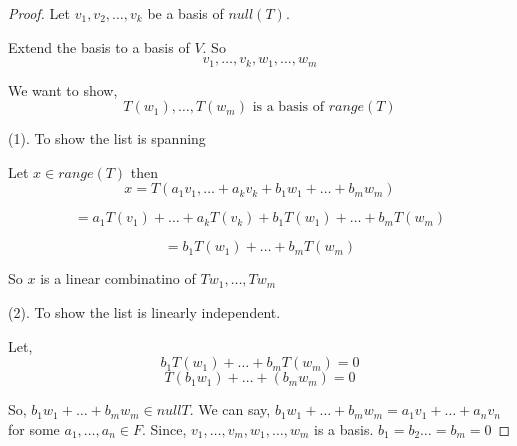 \begin{proof}
    Let $v_1,v_2,\dots,v_k$ be a basis of $null(T)$.

    Extend the basis to a basis of $V$. So 
    $$ v_1,\dots,v_k,w_1,\dots,w_m$$ 

    We want to show, 
    $$ T(w_1),\dots,T(w_m) \text{ is a basis of $range(T)$}$$

    (1). To show the list is spanning

    Let $x \in range(T)$ then 
    $$ x = T(a_1v_1,\dots+a_kv_k+b_1w_1+\dots+b_mw_m) $$ 
    
    $$  = a_1T(v_1) + \dots + a_kT(v_k) + b_1T(w_1) + \dots + b_mT(w_m) $$ 
    
    $$ =b_1T(w_1) + \dots + b_mT(w_m) $$ 

    So $x$ is a linear combinatino of $Tw_1,\dots,Tw_m$

    (2). To show the list is linearly  independent.

    Let, 
    $$ b_1T(w_1) + \dots + b_mT(w_m) = 0 $$ 
    $$ T(b_1w_1) + \dots + (b_mw_m) = 0 $$ 

    So, $b_1w_1+\dots+b_mw_m\in null T$. We can say, $b_1w_1+\dots+b_mw_m = a_1v_1 + \dots + a_nv_n$ for some $a_1,\dots,a_n \in F$. Since, $v_1,\dots,v_m,w_1,\dots,w_m$ is a basis. $b_1=b_2\dots=b_m = 0$

\end{proof}
